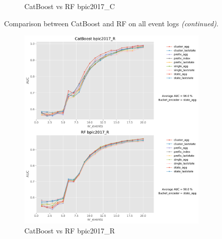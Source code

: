 \documentclass[twoside,11pt]{Latex/Classes/PhDthesisPSnPDF}
\begin{document}
\begin{figure}[t!]
\begin{subfigure}{0.48\textwidth}
		\caption{CatBoost vs RF bpic2017\_C} \label{fig:b17ccr}
	\end{subfigure}
\caption{Comparison between CatBoost and RF on all event logs \textit{(continued)}.}
\label{fig:r2cr}
\end{figure}


\begin{figure}[t!] %
	
	\begin{subfigure}{0.48\textwidth}
		\includegraphics[width=\linewidth]{images/catboost/graphsrf/bpic2017_R_CatBoost_rf.pdf}
		\caption{CatBoost vs RF bpic2017\_R} \label{fig:b17rcr}
	\end{subfigure}\hspace*{\fill}
	\begin{subfigure}{0.48\textwidth}

\end{subfigure}
\end{figure}
\end{document}
